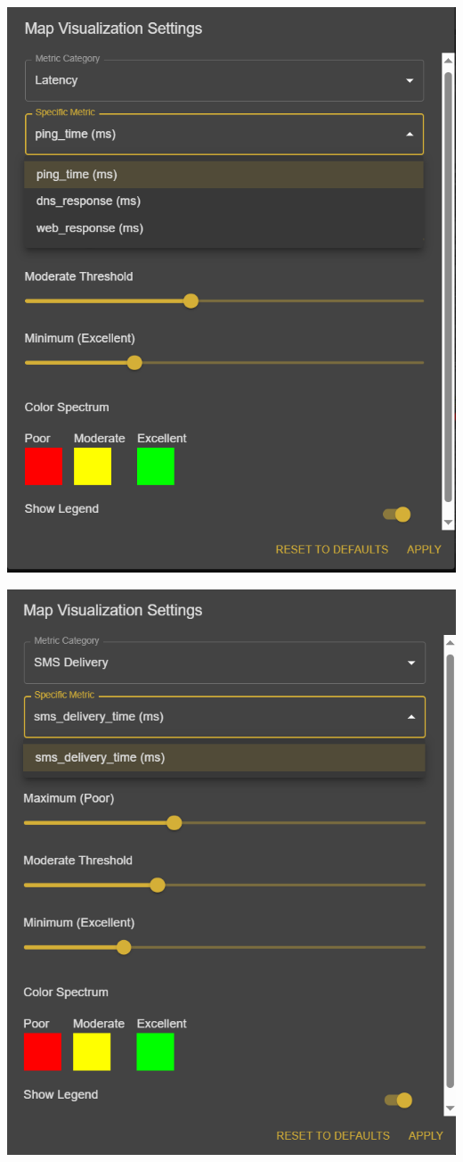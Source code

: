 \begin{itemize}
\begin{center}
        \includegraphics[width=\textwidth]{images/setting_latency_metrics.png}
    \end{center}
    \begin{center}
        \includegraphics[width=\textwidth]{images/settings_sms_catagory.png}

\end{center}
\end{itemize}
